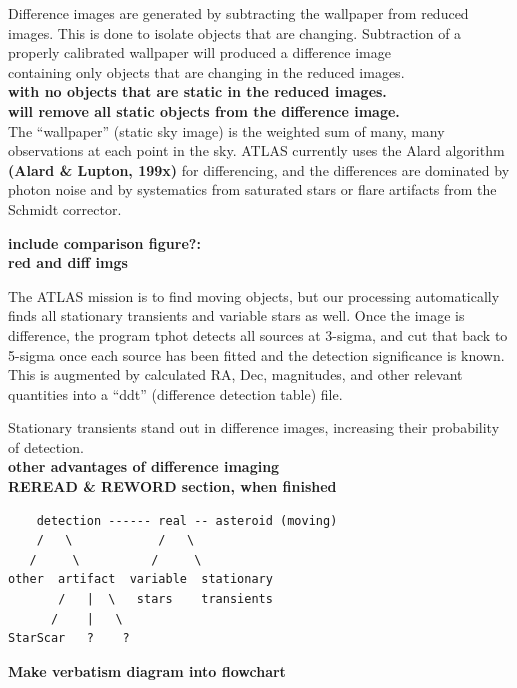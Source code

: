 \documentclass[aps,prb,twocolumn,superscriptaddress]{revtex4-1}
\begin{document}
Difference images are generated by subtracting the wallpaper from reduced 
images. This is done to isolate objects that are changing. Subtraction 
of a properly calibrated wallpaper will produced a difference image \\
containing only objects that are changing in the reduced images.  \\
{\bf with no objects that are static in the reduced images.  }\\
{\bf will remove all static objects from the difference image.  }\\

The ``wallpaper'' (static sky image) is the weighted sum of many, many
observations at each point in the sky.  ATLAS currently uses the
Alard algorithm {\bf (Alard \& Lupton, 199x)} for differencing, and the
differences are dominated by photon noise and by systematics from
saturated stars or flare artifacts from the Schmidt corrector.


{\bf\noindent include comparison figure?:\\ \indent red and diff imgs}


The ATLAS mission is to find moving objects, but our processing
automatically finds all stationary transients and variable stars as
well.  Once the image is difference, the program tphot detects all
sources at 3-sigma, and cut that back to 5-sigma once each source
has been fitted and the detection significance is known.  This
is augmented by calculated RA, Dec, magnitudes, and other relevant
quantities into a ``ddt'' (difference detection table) file.




Stationary transients stand out in difference images, increasing their probability of detection.\\
{\bf other advantages of difference imaging\\}
{\bf REREAD \& REWORD section, when finished\\}
\begin{verbatim}
    detection ------ real -- asteroid (moving)
    /   \            /   \
   /     \          /     \
other  artifact  variable  stationary
       /   |  \   stars    transients
      /    |   \
StarScar   ?    ?
\end{verbatim}
{\bf Make verbatism diagram into flowchart}
\end{document}
